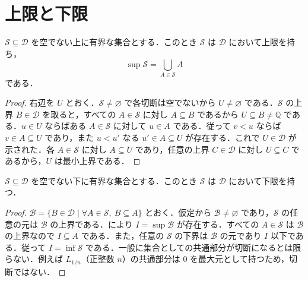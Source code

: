 \section{上限と下限}
\begin{prop}[切断の上限]
$\mathcal S\subseteq\mathcal D$ を空でない上に有界な集合とする．このとき $\mathcal S$ は $\mathcal D$ において上限を持ち，
\[
 \sup\mathcal S=\bigcup_{A\in\mathcal S} A
\]
である．
\end{prop}
\begin{proof}
右辺を $U$ とおく．$\mathcal S\ne\varnothing$ で各切断は空でないから $U\ne\varnothing$ である．$\mathcal S$ の上界 $B\in\mathcal D$ を取ると，すべての $A\in\mathcal S$ に対し $A\subseteq B$ であるから $U\subseteq B\ne\mathbb Q$ である．$u\in U$ ならばある $A\in\mathcal S$ に対して $u\in A$ である．従って $v<u$ ならば $v\in A\subseteq U$ であり，また $u<u'$ なる $u'\in A\subseteq U$ が存在する．これで $U\in\mathcal D$ が示された．各 $A\in\mathcal S$ に対し $A\subseteq U$ であり，任意の上界 $C\in\mathcal D$ に対し $U\subseteq C$ であるから，$U$ は最小上界である．
\end{proof}
\begin{prop}[切断の下限]
$\mathcal S\subseteq\mathcal D$ を空でない下に有界な集合とする．このとき $\mathcal S$ は $\mathcal D$ において下限を持つ．
\end{prop}
\begin{proof}
$\mathcal B=\{B\in\mathcal D\mid \forall A\in\mathcal S,\ B\subseteq A\}$ とおく．仮定から $\mathcal B\ne\varnothing$ であり，$\mathcal S$ の任意の元は $\mathcal B$ の上界である．により $I=\sup\mathcal B$ が存在する．すべての $A\in\mathcal S$ は $\mathcal B$ の上界なので $I\subseteq A$ である．また，任意の $\mathcal S$ の下界は $\mathcal B$ の元であり $I$ 以下である．従って $I=\inf\mathcal S$ である．一般に集合としての共通部分が切断になるとは限らない．例えば $L_{1/n}$（正整数 $n$）の共通部分は $0$ を最大元として持つため，切断ではない．
\end{proof}
